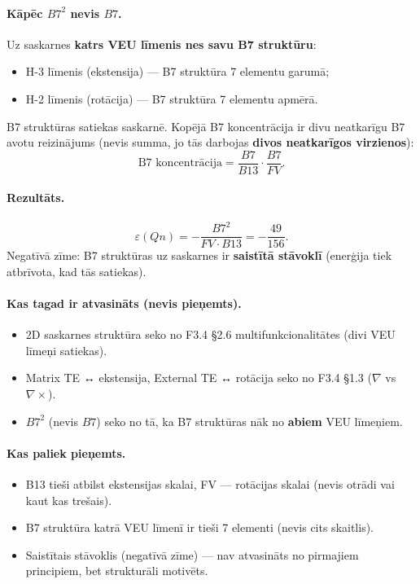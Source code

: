 \documentclass[12pt,a4paper]{article}
\begin{document}
\paragraph{Kāpēc $B7^2$ nevis $B7$.}
Uz saskarnes \textbf{katrs VEU līmenis nes savu B7 struktūru}:
\begin{itemize}
    \item H-3 līmenis (ekstensija) — B7 struktūra 7 elementu garumā;
    \item H-2 līmenis (rotācija) — B7 struktūra 7 elementu apmērā.
\end{itemize}
B7 struktūras satiekas saskarnē. Kopējā B7 koncentrācija ir divu neatkarīgu B7 avotu reizinājums (nevis summa, jo tās darbojas \textbf{divos neatkarīgos virzienos}):
\[
\text{B7 koncentrācija} = \frac{B7}{B13} \cdot \frac{B7}{FV}.
\]

\paragraph{Rezultāts.}
\[
\varepsilon(Qn) = -\frac{B7^2}{FV \cdot B13} = -\frac{49}{156}.
\]
Negatīvā zīme: B7 struktūras uz saskarnes ir \textbf{saistītā stāvoklī} (enerģija tiek atbrīvota, kad tās satiekas).

\paragraph{Kas tagad ir atvasināts (nevis pieņemts).}
\begin{itemize}
    \item 2D saskarnes struktūra seko no F3.4 §2.6 multifunkcionalitātes (divi VEU līmeņi satiekas).
    \item Matrix TE ↔ ekstensija, External TE ↔ rotācija seko no F3.4 §1.3 ($\nabla$ vs $\nabla \times$).
    \item $B7^2$ (nevis $B7$) seko no tā, ka B7 struktūras nāk no \textbf{abiem} VEU līmeņiem.
\end{itemize}

\paragraph{Kas paliek pieņemts.}
\begin{itemize}
    \item B13 tieši atbilst ekstensijas skalai, FV — rotācijas skalai (nevis otrādi vai kaut kas trešais).
    \item B7 struktūra katrā VEU līmenī ir tieši 7 elementi (nevis cits skaitlis).
    \item Saistītais stāvoklis (negatīvā zīme) — nav atvasināts no pirmajiem principiem, bet strukturāli motivēts.
\end{itemize}
\end{document}
